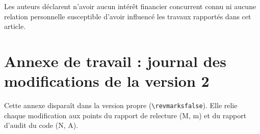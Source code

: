 \documentclass[11pt,a4paper]{article}
\newif\ifrevmarks
\newcommand{\adir}[1]{\ifrevmarks\textcolor{violet}{\textbf{[À VALIDER AVEC LA DIRECTRICE : #1]}}\fi}
\begin{document}
Les auteurs déclarent n'avoir aucun intérêt financier concurrent connu ni aucune relation personnelle susceptible d'avoir influencé les travaux rapportés dans cet article.




\adir{style bibliographique : utiliser le modèle de la revue cible (sn-jnl pour Springer) ; corriger les entrées de \texttt{RL\_references.bib} signalées dans le rapport de relecture (section 5.4).}

\ifrevmarks
\clearpage
\appendix
\section*{Annexe de travail : journal des modifications de la version 2}

Cette annexe disparaît dans la version propre (\texttt{\textbackslash revmarksfalse}). Elle relie chaque modification aux points du rapport de relecture (M, m) et du rapport d'audit du code (N, A).
\end{document}
